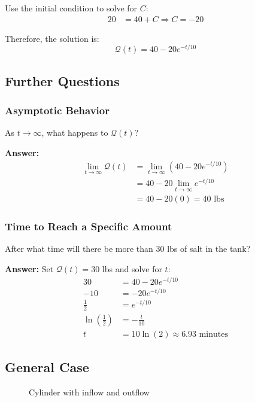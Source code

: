 \documentclass{article}
\begin{document}
Use the initial condition to solve for $C$:
\begin{align*}
    20 &= 40 + C \Rightarrow C = -20
\end{align*}

Therefore, the solution is:
\[
    \mathcal{Q}(t) = 40 - 20e^{-t/10}
\]


\subsection*{Further Questions}

\subsubsection*{Asymptotic Behavior}
As $t \rightarrow \infty$, what happens to $\mathcal{Q}(t)$?

\textbf{Answer:} 
\begin{align*}
    \lim_{t \to \infty} \mathcal{Q}(t) &= \lim_{t \to \infty} (40 - 20e^{-t/10}) \\
    &= 40 - 20 \lim_{t \to \infty} e^{-t/10} \\
    &= 40 - 20(0) = 40 \text{ lbs}
\end{align*}

\subsubsection*{Time to Reach a Specific Amount}
After what time will there be more than 30 lbs of salt in the tank?

\textbf{Answer:} Set $\mathcal{Q}(t) = 30$ lbs and solve for $t$:
\begin{align*}
    30 &= 40 - 20e^{-t/10} \\
    -10 &= -20e^{-t/10} \\
    \frac{1}{2} &= e^{-t/10} \\
    \ln(\frac{1}{2}) &= -\frac{t}{10} \\
    t &= 10\ln(2) \approx 6.93 \text{ minutes}
\end{align*}

\subsection*{General Case}

\begin{figure}[h]
    \centering
    \caption{Cylinder with inflow and outflow}
\end{figure}
\end{document}
